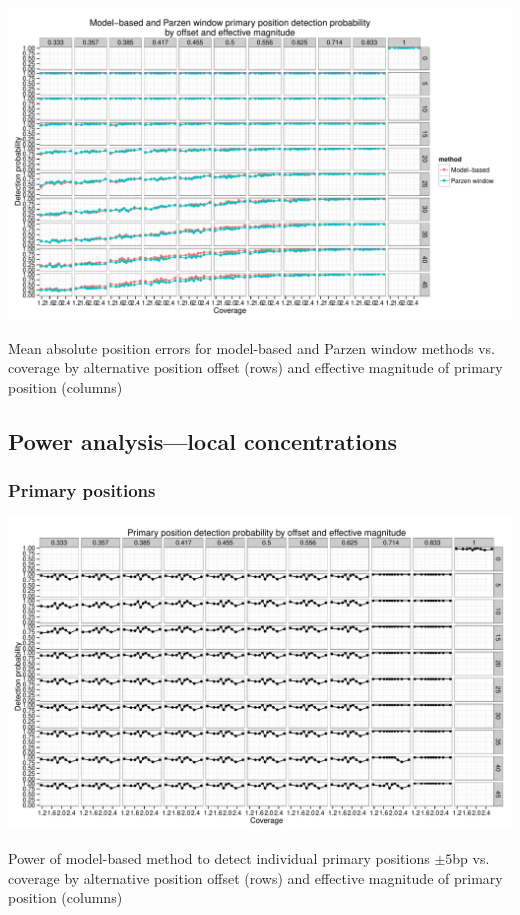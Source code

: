 \begin{FPfigure}
\centering
\includegraphics[page=5,width=0.95\textheight,angle=90]{figures/nucleosomes/plots_compare_power}
\caption{Mean absolute position errors for model-based and Parzen window methods vs. coverage by alternative position offset (rows) and effective magnitude of primary position (columns)}
\end{FPfigure}
\afterpage{\clearpage}

\clearpage

\subsection{Power analysis---local concentrations}
\label{sec:detection}

\subsubsection{Primary positions}

\begin{FPfigure}
\centering
\includegraphics[page=1,width=0.95\textheight,angle=90]{figures/nucleosomes/plots_power_pm3}
\caption{Power of model-based method to detect individual primary positions $\pm 5$bp vs. coverage by alternative position offset (rows) and effective magnitude of primary position (columns)}
\end{FPfigure}
\afterpage{\clearpage}

